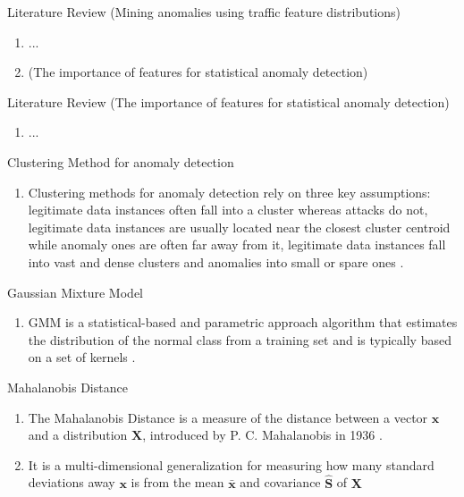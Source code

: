\documentclass[newPxFont, numfooter, sectionpages]{beamer}
\begin{document}
\begin{frame}[c]{Literature Review}
	\cite{lakhina2005mining} (Mining anomalies using traffic feature distributions)
	\begin{enumerate}
		\item ...
		\item \cite{goldberg2015importance} (The importance of features for statistical anomaly detection)
	\end{enumerate}	
\end{frame}

\begin{frame}[c]{Literature Review}
	\cite{goldberg2015importance} (The importance of features for statistical anomaly detection)
	\begin{enumerate}
		\item ...
	\end{enumerate}	
\end{frame}

\begin{frame}[c]{Clustering Method for anomaly detection}
	\begin{enumerate}
		\item Clustering methods for anomaly detection rely on three key assumptions: legitimate data instances often fall into a cluster whereas attacks do not, legitimate data instances are usually located near the closest cluster centroid while anomaly ones are often far away from it, legitimate data instances fall into vast and dense clusters and anomalies into small or spare ones \cite{moustafa2019holistic}.
	\end{enumerate}	
\end{frame}

\begin{frame}[c]{Gaussian Mixture Model}
	\begin{enumerate}
		\item GMM is a statistical-based and parametric approach algorithm that estimates the distribution of the normal class from a training set and is typically based on a set of kernels \cite{moustafa2019holistic}.
	\end{enumerate}	
\end{frame}

\begin{frame}[c]{Mahalanobis Distance}
	\begin{enumerate}
		\item The Mahalanobis Distance is a measure of the distance between a vector $\boldsymbol{x}$ and a distribution $\boldsymbol{X}$, introduced by P. C. Mahalanobis in 1936 \cite{mahalanobis1936generalized}.
		\item It is a multi-dimensional generalization for measuring how many standard deviations away $\boldsymbol{x}$ is from the mean $\boldsymbol{\bar{x}}$ and covariance $\boldsymbol{\hat{S}}$ of $\boldsymbol{X}$
	\end{enumerate}	
\end{frame}
\end{document}
